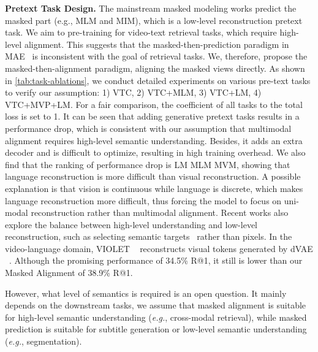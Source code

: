 \documentclass[10pt,twocolumn,letterpaper]{article}
\begin{document}
\vspace{1mm}\noindent\textbf{Pretext Task Design.} The mainstream masked modeling works predict the masked part (e.g., MLM and MIM), which is a low-level reconstruction pretext task. We aim to pre-training for video-text retrieval tasks, which require high-level alignment. This suggests that the masked-then-prediction paradigm in MAE~\cite{mae} is inconsistent with the goal of retrieval tasks. We, therefore, propose the masked-then-alignment paradigm, aligning the masked views directly. As shown in \cref{tab:task-ablations}, we conduct detailed experiments on various pre-text tasks to verify our assumption: 1) VTC, 2) VTC+MLM, 3) VTC+LM, 4) VTC+MVP+LM. For a fair comparison, the coefficient of all tasks to the total loss is set to 1. It can be seen that adding generative pretext tasks results in a performance drop, which is consistent with our assumption that multimodal alignment requires high-level semantic understanding. Besides, it adds an extra decoder and is difficult to optimize, resulting in high training overhead. We also find that the ranking of performance drop is LM  MLM  MVM, showing that language reconstruction is more difficult than visual reconstruction. A possible explanation is that vision is continuous while language is discrete, which makes language reconstruction more difficult, thus forcing the model to focus on uni-modal reconstruction rather than multimodal alignment. Recent works also explore the balance between high-level  understanding and low-level reconstruction, such as selecting  semantic targets~\cite{beit, maskft} rather than pixels. In the video-language domain, VIOLET ~\cite{VIOLET} reconstructs  visual tokens generated by dVAE ~\cite{dvae}. Although the promising performance of 34.5\% R@1, it still is lower than our Masked Alignment of 38.9\% R@1.

However, what level of semantics is required is an open question. It mainly depends on the downstream tasks, we assume that masked alignment is suitable for high-level semantic understanding (\emph{e.g.}, cross-modal retrieval), while masked prediction is suitable for subtitle generation or low-level semantic understanding (\emph{e.g.}, segmentation).
\end{document}
